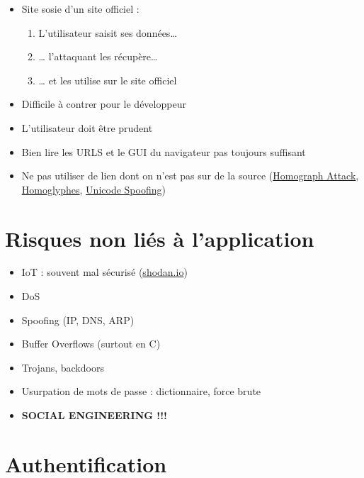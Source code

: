 \begin{itemize}
\tightlist
\item
  Site sosie d'un site officiel :

  \begin{enumerate}
  \def\labelenumi{\arabic{enumi}.}
  \tightlist
  \item
    L'utilisateur saisit ses données\ldots{}
  \item
    \ldots{} l'attaquant les récupère\ldots{}
  \item
    \ldots{} et les utilise sur le site officiel
  \end{enumerate}
\item
  Difficile à contrer pour le développeur
\item
  L'utilisateur doit être prudent
\item
  Bien lire les URLS et le GUI du navigateur pas toujours suffisant
\item
  Ne pas utiliser de lien dont on n'est pas sur de la source
  (\href{https://www.xudongz.com/blog/2017/idn-phishing/}{Homograph
  Attack},
  \href{https://github.com/codebox/homoglyph/blob/master/raw_data/char_codes.txt}{Homoglyphes},
  \href{https://onlineunicodetools.com/spoof-unicode-text}{Unicode
  Spoofing})
\end{itemize}

\hypertarget{risques-non-liuxe9s-uxe0-lapplication}{%
\section{Risques non liés à
l'application}\label{risques-non-liuxe9s-uxe0-lapplication}}

\begin{itemize}
\tightlist
\item
  IoT : souvent mal sécurisé (\href{https://www.shodan.io/}{shodan.io})
\item
  DoS
\item
  Spoofing (IP, DNS, ARP)
\item
  Buffer Overflows (surtout en C)
\item
  Trojans, backdoors
\item
  Usurpation de mots de passe : dictionnaire, force brute
\item
  \textbf{SOCIAL ENGINEERING !!!}
\end{itemize}

\hypertarget{authentification}{%
\section{Authentification}\label{authentification}}

